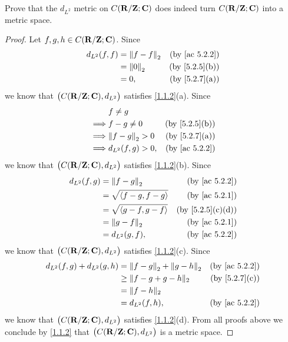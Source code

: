 \begin{exercise}\label{ex 5.2.4}
  Prove that the \(d_{L^2}\) metric on \(C(\mathbf{R} / \mathbf{Z} ; \mathbf{C})\) does indeed turn \(C(\mathbf{R} / \mathbf{Z} ; \mathbf{C})\) into a metric space.
\end{exercise}

\begin{proof}
  Let \(f, g, h \in C(\mathbf{R} / \mathbf{Z} ; \mathbf{C})\).
  Since
  \begin{align*}
    d_{L^2}(f, f) & = \norm*{f - f}_2 & \text{(by \cref{ac 5.2.2})} \\
                  & = \norm*{0}_2     & \text{(by \cref{5.2.5}(b))} \\
                  & = 0,              & \text{(by \cref{5.2.7}(a))}
  \end{align*}
  we know that \(\big(C(\mathbf{R} / \mathbf{Z} ; \mathbf{C}), d_{L^2}\big)\) satisfies \cref{1.1.2}(a).
  Since
  \begin{align*}
             & f \neq g                                          \\
    \implies & f - g \neq 0        & \text{(by \cref{5.2.5}(b))} \\
    \implies & \norm*{f - g}_2 > 0 & \text{(by \cref{5.2.7}(a))} \\
    \implies & d_{L^2}(f, g) > 0,  & \text{(by \cref{ac 5.2.2})}
  \end{align*}
  we know that \(\big(C(\mathbf{R} / \mathbf{Z} ; \mathbf{C}), d_{L^2}\big)\) satisfies \cref{1.1.2}(b).
  Since
  \begin{align*}
    d_{L^2}(f, g) & = \norm*{f - g}_2              & \text{(by \cref{ac 5.2.2})}    \\
                  & = \sqrt{\inner*{f - g, f - g}} & \text{(by \cref{ac 5.2.1})}    \\
                  & = \sqrt{\inner*{g - f, g - f}} & \text{(by \cref{5.2.5}(c)(d))} \\
                  & = \norm*{g - f}_2              & \text{(by \cref{ac 5.2.1})}    \\
                  & = d_{L^2}(g, f),               & \text{(by \cref{ac 5.2.2})}
  \end{align*}
  we know that \(\big(C(\mathbf{R} / \mathbf{Z} ; \mathbf{C}), d_{L^2}\big)\) satisfies \cref{1.1.2}(c).
  Since
  \begin{align*}
    d_{L^2}(f, g) + d_{L^2}(g, h) & = \norm*{f - g}_2 + \norm*{g - h}_2 & \text{(by \cref{ac 5.2.2})} \\
                                  & \geq \norm{f - g + g - h}_2         & \text{(by \cref{5.2.7}(c))} \\
                                  & = \norm{f - h}_2                                                  \\
                                  & = d_{L^2}(f, h),                    & \text{(by \cref{ac 5.2.2})}
  \end{align*}
  we know that \(\big(C(\mathbf{R} / \mathbf{Z} ; \mathbf{C}), d_{L^2}\big)\) satisfies \cref{1.1.2}(d).
  From all proofs above we conclude by \cref{1.1.2} that \(\big(C(\mathbf{R} / \mathbf{Z} ; \mathbf{C}), d_{L^2}\big)\) is a metric space.
\end{proof}

